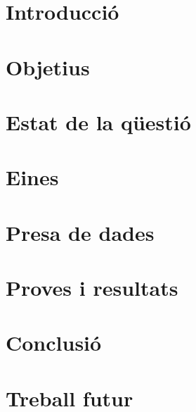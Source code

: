 \documentclass[a4paper, 10pt]{article}
\date{\today{}}
\begin{document}
\tableofcontents
\newpage

\section{Introducció}

\newpage

\section{Objetius}

\newpage

\section{Estat de la qüestió}

\newpage

\section{Eines}

\newpage

\section{Presa de dades}

\newpage

\section{Proves i resultats}

\newpage

\section{Conclusió}

\newpage

\section{Treball futur}

\newpage



\end{document}
